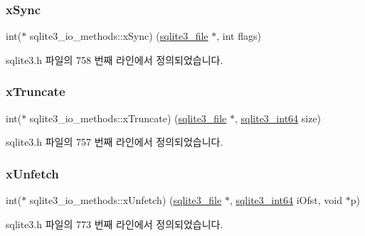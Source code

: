 \subsubsection{\texorpdfstring{x\+Sync}{xSync}}
{\footnotesize\ttfamily int($\ast$ sqlite3\+\_\+io\+\_\+methods\+::x\+Sync) (\hyperlink{structsqlite3__file}{sqlite3\+\_\+file} $\ast$, int flags)}



sqlite3.\+h 파일의 758 번째 라인에서 정의되었습니다.

\mbox{\label{structsqlite3__io__methods_abe797948913bfe94d4fab7246773af50}} 
\subsubsection{\texorpdfstring{x\+Truncate}{xTruncate}}
{\footnotesize\ttfamily int($\ast$ sqlite3\+\_\+io\+\_\+methods\+::x\+Truncate) (\hyperlink{structsqlite3__file}{sqlite3\+\_\+file} $\ast$, \hyperlink{sqlite3_8h_a0a4d3e6c1ad46f90e746b920ab6ca0d2}{sqlite3\+\_\+int64} size)}



sqlite3.\+h 파일의 757 번째 라인에서 정의되었습니다.

\mbox{\label{structsqlite3__io__methods_abebf1bbaa50bea56f0e37d0f66193bda}} 
\subsubsection{\texorpdfstring{x\+Unfetch}{xUnfetch}}
{\footnotesize\ttfamily int($\ast$ sqlite3\+\_\+io\+\_\+methods\+::x\+Unfetch) (\hyperlink{structsqlite3__file}{sqlite3\+\_\+file} $\ast$, \hyperlink{sqlite3_8h_a0a4d3e6c1ad46f90e746b920ab6ca0d2}{sqlite3\+\_\+int64} i\+Ofst, void $\ast$p)}



sqlite3.\+h 파일의 773 번째 라인에서 정의되었습니다.

\mbox{\label{structsqlite3__io__methods_a5ce75a5ca2df9c1edcaef74d4c0d7e38}} 
